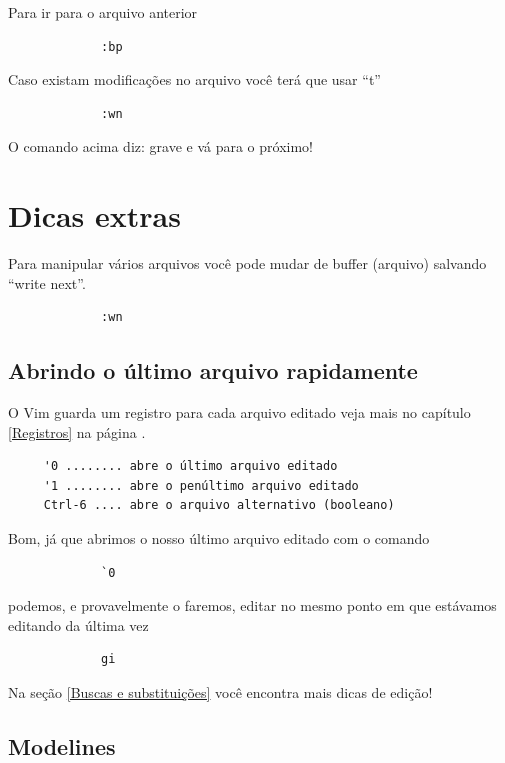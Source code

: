 \documentclass[10pt,a4paper,openany]{book}
\begin{document}
Para ir para o arquivo anterior

\begin{verbatim}
			 :bp
\end{verbatim}

Caso existam modificações no arquivo você terá que usar ``t''

\begin{verbatim}
			 :wn
\end{verbatim}

O comando acima diz: grave e vá para o próximo!

\section{Dicas extras}
\label{Dicas extras}

Para manipular vários arquivos você pode mudar de buffer (arquivo)
salvando ``write next''.

\begin{verbatim}
			 :wn
\end{verbatim}



\subsection{Abrindo o último arquivo rapidamente}
O Vim guarda um registro para cada arquivo editado veja
mais no capítulo \ref{Registros} na página \pageref{Registros}.

\begin{verbatim}
	 '0 ........ abre o último arquivo editado
	 '1 ........ abre o penúltimo arquivo editado
	 Ctrl-6 .... abre o arquivo alternativo (booleano)
\end{verbatim}

Bom, já que abrimos o nosso último arquivo editado com o comando

\begin{verbatim}
			 `0
\end{verbatim}

podemos, e provavelmente o faremos, editar no mesmo ponto em que estávamos
editando da última vez

\begin{verbatim}
			 gi
\end{verbatim}

Na seção \ref{Buscas e substituições} você encontra mais dicas de edição!


\subsection{Modelines}\label{sec:Modelines}
\end{document}
